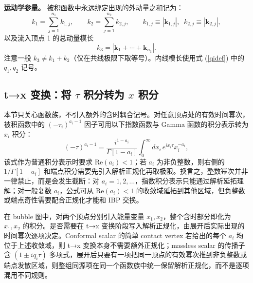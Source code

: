 ﻿\documentclass[a4paper,11pt]{article}
\begin{document}
\textbf{运动学参量。} 被积函数中永远绑定出现的外动量之和记为：
\begin{equation}
    k_1=\sum_{j=1}^{n_1} k_{1,j},\qquad k_2=\sum_{j=1}^{n_2} k_{2,j},\qquad k_{1,j}\equiv|\boldsymbol{k}_{1,j}|,\;\; k_{2,j}\equiv|\boldsymbol{k}_{2,j}|,
\end{equation}
以及流入顶点 1 的总动量模长
\begin{equation}
    k_3=|\boldsymbol{k}_1+\cdots+\boldsymbol{k}_{n_1}|.
\end{equation}
注意一般 $k_3\neq k_1+k_2$（仅在共线极限下取等号）。内线模长使用式 (\ref{qidef}) 中的 $q_1,q_2$ 记号。

\subsection{t→x 变换：将 $\tau$ 积分转为 $x$ 积分}

本节只关心函数族，不引入额外的含时耦合记号。对任意顶点处的有效时间幂次，被积函数中的 $(-\tau_i)^{a_i-1}$ 因子可用以下指数函数与 Gamma 函数的积分表示转为 $x_i$ 积分：
\begin{equation}
    (-\tau)^{a_i-1}=\frac{i^{1-a_i}}{\Gamma[1-a_i]}\int_0^\infty dx_i\,e^{ix_i\tau}x_i^{-a_i},
\end{equation}
该式作为普通积分表示时要求 $\mathrm{Re}(a_i)<1$；若 $a_i$ 为非负整数，则右侧的 $1/\Gamma[1-a_i]$ 和端点积分需要先引入解析正规化再取极限。换言之，整数幂次并非一律禁止，而是会发生截断：对 $a_i=1,2,\ldots$，指数积分表示只能通过解析延拓理解；对一般复数 $a_i$，公式可从 $\mathrm{Re}(a_i)<1$ 的收敛域延拓到其他区域，但负整数或端点奇性需要配合正规化才能和 IBP 交换。

在 bubble 图中，对两个顶点分别引入能量变量 $x_1,x_2$，整个含时部分即化为 $x_1,x_2$ 的积分。是否需要在 t→x 变换阶段写入解析正规化，由展开后实际出现的时间幂次逐项决定。Conformal scalar 的简单 contact vertex 若给出的每个 $a_i$ 均位于上述收敛域，则 t→x 变换本身不需要额外正规化；massless scalar 的传播子含 $(1\pm i q_i\tau)$ 多项式，展开后只要有一项把同一顶点的有效幂次推到非负整数或端点发散区域，则整组同源项在同一个函数族中统一保留解析正规化，而不是逐项混用不同规则。
\end{document}
